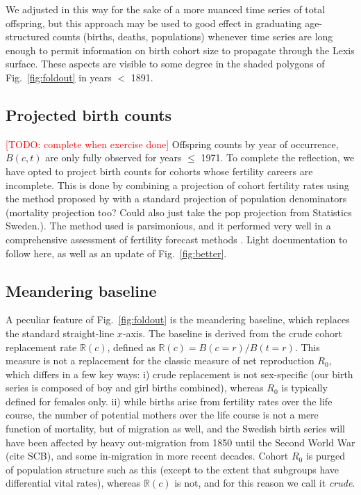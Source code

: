 \documentclass{article}
\newcommand\todo[1]{\textcolor{red}{[TODO: #1]}}
\begin{document}
We adjusted in this way for the sake of a more nuanced time series of total offspring, but this approach may be used to good effect in graduating age-structured counts (births, deaths, populations) whenever time series are long enough to permit information on birth cohort size to propagate through the Lexis surface. These aspects are visible to some degree in the shaded polygons of Fig.~\ref{fig:foldout} in years $<$ 1891.

\subsection{Projected birth counts}
\label{sec:proj}
\todo{complete when exercise done}
Offspring counts by year of occurrence, $B(c,t)$ are only fully observed for years $\le$ 1971. To complete the reflection, we have opted to project birth counts for cohorts whose fertility careers are incomplete. This is done by combining a projection of cohort fertility rates using the method proposed by \citet{de1985time} with a standard projection of population denominators (mortality projection too? Could also just take the pop projection from Statistics Sweden.). The method used is parsimonious, and it performed very well in a comprehensive assessment of fertility forecast methods \citep{bohk2018forecast}. Light documentation to follow here, as well as an update of Fig.~\ref{fig:better}.

\subsection{Meandering baseline}
\label{sec:baseline}
A peculiar feature of Fig.~\ref{fig:foldout} is the meandering baseline, which replaces the standard straight-line $x$-axis. The baseline is derived from the crude cohort replacement rate $\mathbb{R}(c)$, defined as $\mathbb{R}(c) = B(c=r) / B(t=r)$. This measure is not a replacement for the classic measure of net reproduction $R_0$, which differs in a few key ways: i) crude replacement is not sex-specific (our birth series is composed of boy and girl births combined), whereas $R_0$ is typically defined for females only. ii) while births arise from fertility rates over the life course, the number of potential mothers over the life course is not a mere function of mortality, but of migration as well, and the Swedish birth series will have been affected by heavy out-migration from 1850 until the Second World War (cite SCB), and some in-migration in more recent decades. Cohort $R_0$ is purged of population structure such as this (except to the extent that subgroups have differential vital rates), whereas $\mathbb{R}(c)$ is not, and for this reason we call it \emph{crude}.
\end{document}
